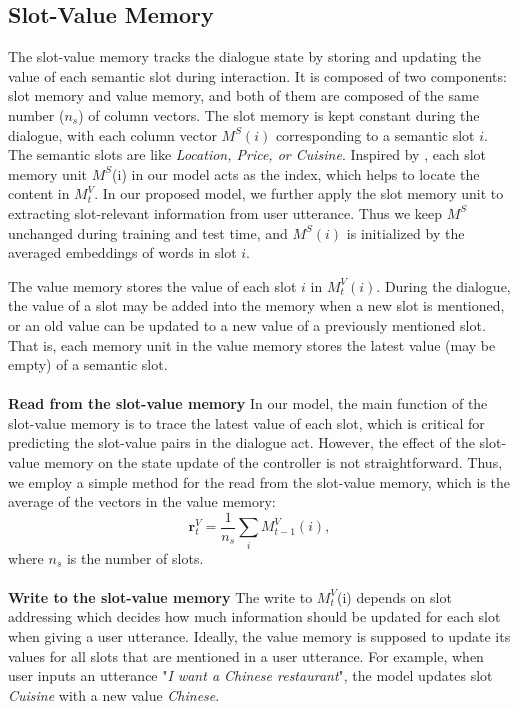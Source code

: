 
\subsection{Slot-Value Memory}
\label{sec:sv-memory}
The slot-value memory tracks the dialogue state by storing and updating the value of each semantic slot during interaction. It is composed of two components: slot memory and value memory, and both of them are composed of the same number ($n_s$) of column vectors. The slot memory is kept constant during the dialogue, with each column vector $M^S(i)$ corresponding to a semantic slot $i$. The semantic slots are like {\it Location, Price, or Cuisine}. 
Inspired by \cite{miller2016key}, each slot memory unit $M^S$(i) in our model acts as the index, which helps to locate the content in $M_t^V$. In our proposed model, we further apply the slot memory unit to extracting slot-relevant information from user utterance.
Thus we keep $M^S$ unchanged during training and test time, and $M^S(i)$ is initialized by the averaged embeddings of words in slot $i$.

The value memory stores the value of each slot $i$ in $M_t^V(i)$. During the dialogue, the value of a slot may be added into the memory when a new slot is mentioned, or an old value can be updated to a new value of a previously mentioned slot. That is, each memory unit in the value memory stores the latest value (may be empty) of a semantic slot.
\\ \\
{\bf Read from the slot-value memory}
In our model, the main function of the slot-value memory is to trace the latest value of each slot, which is critical for predicting the slot-value pairs in the dialogue act. However, the effect of the slot-value memory on the state update of the controller is not straightforward. Thus, we employ a simple method for the read from the slot-value memory, which is the average of the vectors in the value memory:
\begin{equation}
    \mathbf{r}_t^V=\frac{1}{n_s}\sum_i{M_{t-1}^V(i)},
\end{equation}
where $n_s$ is the number of slots.
\\ \\
{\bf Write to the slot-value memory}
%
The write to $M_t^V$(i) depends on slot addressing which decides how much information should be updated for each slot when giving a user utterance. Ideally, the value memory is supposed to update its values for all slots that are mentioned in a user utterance. 
For example, when user inputs an utterance "{\em I want a Chinese restaurant}",  the model updates slot {\it Cuisine} with a new value {\em Chinese}.

